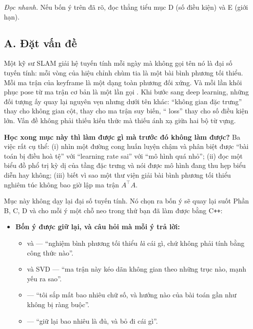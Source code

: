 \documentclass[../../../deep_learning.tex]{subfiles}
\begin{document}
\emph{Đọc nhanh.} Nếu bốn ý trên đã rõ, đọc thẳng tiểu mục D (số điều kiện) và E (giới hạn).

\subsection{A. Đặt vấn đề}
Một kỹ sư SLAM giải hệ tuyến tính mỗi ngày mà không gọi tên nó là đại số tuyến tính: mỗi vòng  của hiệu chỉnh chùm tia là một bài bình phương tối thiểu. Mỗi ma trận  của keyframe là một dạng toàn phương đối xứng. Và mỗi lần khôi phục pose từ ma trận cơ bản là một lần gọi . Khi bước sang deep learning, những đối tượng ấy quay lại nguyên vẹn nhưng dưới tên khác: ``không gian đặc trưng'' thay cho không gian cột,  thay cho ma trận suy biến, `` loss'' thay cho số điều kiện lớn. Vấn đề không phải thiếu kiến thức mà thiếu ánh xạ giữa hai bộ từ vựng.

\textbf{Học xong mục này thì làm được gì mà trước đó không làm được?} Ba việc rất cụ thể: (i) nhìn một đường cong huấn luyện chậm và phân biệt được ``bài toán bị điều hoà tệ'' với ``learning rate sai'' với ``mô hình quá nhỏ''; (ii) đọc một biểu đồ phổ trị kỳ dị của tầng đặc trưng và nói được mô hình đang thu hẹp biểu diễn hay không; (iii) biết vì sao một thư viện giải bài bình phương tối thiểu nghiêm túc không bao giờ lập ma trận \(A^\top A\).

Mục này không dạy lại đại số tuyến tính. Nó chọn ra bốn ý sẽ quay lại suốt Phần B, C, D và cho mỗi ý một chỗ neo trong thứ bạn đã làm được bằng C\texttt{++}:

\begin{itemize}
\item \textbf{Bốn ý được giữ lại, và câu hỏi mà mỗi ý trả lời:}
  \begin{itemize}
  \item {} và  --- ``nghiệm bình phương tối thiểu \emph{là} cái gì, chứ không phải tính bằng công thức nào''.
  \item {} và SVD --- ``ma trận này kéo dãn không gian theo những trục nào, mạnh yếu ra sao''.
  \item {} --- ``tôi sắp mất bao nhiêu chữ số, và hướng nào của bài toán gần như không bị ràng buộc''.
  \item {} --- ``giữ lại bao nhiêu là đủ, và bỏ đi cái gì''.
  \end{itemize}
\end{itemize}
\end{document}
